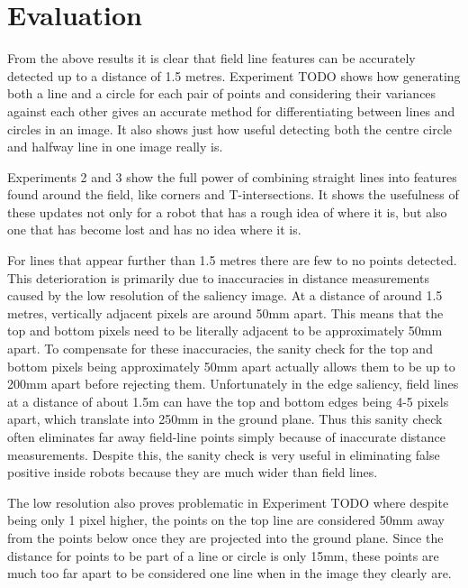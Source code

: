 \documentclass{article}
\begin{document}
\section{Evaluation}
From the above results it is clear that field line features can be accurately detected up to a distance of 1.5 metres. Experiment TODO shows how generating both a line and a circle for each pair of points and considering their variances against each other gives an accurate method for differentiating between lines and circles in an image. It also shows just how useful detecting both the centre circle and halfway line in one image really is.

Experiments 2 and 3 show the full power of combining straight lines into features found around the field, like corners and T-intersections. It shows the usefulness of these updates not only for a robot that has a rough idea of where it is, but also one that has become lost and has no idea where it is.

For lines that appear further than 1.5 metres there are few to no points detected. This deterioration is primarily due to inaccuracies in distance measurements caused by the low resolution of the saliency image. At a distance of around 1.5 metres, vertically adjacent pixels are around 50mm apart. This means that the top and bottom pixels need to be literally adjacent to be approximately 50mm apart. To compensate for these inaccuracies, the sanity check for the top and bottom pixels being approximately 50mm apart actually allows them to be up to 200mm apart before rejecting them. Unfortunately in the edge saliency, field lines at a distance of about 1.5m can have the top and bottom edges being 4-5 pixels apart, which translate into 250mm in the ground plane. Thus this sanity check often eliminates far away field-line points simply because of inaccurate distance measurements. Despite this, the sanity check is very useful in eliminating false positive inside robots because they are much wider than field lines.

The low resolution also proves problematic in Experiment TODO where despite being only 1 pixel higher, the points on the top line are considered 50mm away from the points below once they are projected into the ground plane. Since the distance for points to be part of a line or circle is only 15mm, these points are much too far apart to be considered one line when in the image they clearly are.
\end{document}

